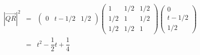 \documentclass[dvipdfmx,a4]{jsarticle}
\begin{document}
\begin{eqnarray*}
  |\overrightarrow{QR}| ^2
  &=&
  \begin{pmatrix}
    0 &t-1/2 & 1/2
  \end{pmatrix}
  \begin{pmatrix}
    1 & 1/2 & 1/2 \\ 
    1/2 & 1 & 1/2 \\
    1/2 & 1/2 & 1
  \end{pmatrix}
  \begin{pmatrix}
    0\\
    t-1/2\\
    1/2
  \end{pmatrix}\\
  &=&
  t^2-\dfrac{1}{2}t+\dfrac{1}{4}
\end{eqnarray*}
\end{document}
